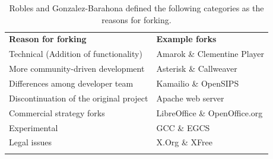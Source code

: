 \documentclass[12pt,letterpaper]{gthesis2}  %
\begin{document}
\begin{table}[!ht]
\centering
\caption[The main reasons for forking]{Robles and Gonzalez-Barahona \cite{Robles} defined the following categories as the reasons for forking.}
\label{tableReasonsForForking}
\begin{tabular}{p{} p{}}
\hline\noalign{\smallskip}
\textbf{Reason for forking} & \textbf{Example forks} \\
\noalign{\smallskip}\hline\noalign{\smallskip}
Technical (Addition of functionality) & Amarok \& Clementine Player \\ \hline
More community-driven development & Asterisk \& Callweaver \\ \hline
Differences among developer team & Kamailio \& OpenSIPS \\ \hline
Discontinuation of the original project & Apache web server \\ \hline
Commercial strategy forks & LibreOffice \& OpenOffice.org \\ \hline
Experimental & GCC \& EGCS \\ \hline
Legal issues & X.Org \& XFree\\
\noalign{\smallskip}\hline
\end{tabular}
\end{table}


\end{document}
